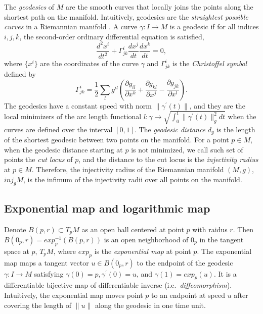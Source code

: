 \documentclass[11pt,a4paper,]{article}
\begin{document}
The \emph{geodesics} of \(M\) are the smooth curves that locally joins the points along the shortest path on the manifold. Intuitively, geodesics are the \emph{straightest possible curves} in a Riemannian manifold \autocite[Section 7.2.3 of][]{Nakahara2018-zs}.
A curve \(\gamma: I \rightarrow M\) is a geodesic if for all indices \(i,j,k\), the second-order ordinary differential equation is satisfied,
\[
\frac{d^2 x^i}{dt^2} + \Gamma^i_{jk} \frac{d x^j}{dt} \frac{dx^k}{dt} = 0,
\]
where \(\{x^i\}\) are the coordinates of the curve \(\gamma\) and \(\Gamma^i_{jk}\) is the \emph{Christoffel symbol} defined by
\[
\Gamma^i_{jk} = \frac{1}{2} \sum_l g^{il} (\frac{\partial g_{il}}{\partial x^k} 
+ \frac{\partial g_{kl}}{\partial x^j} - \frac{\partial g_{jk}}{\partial x^l}).
\]
The geodesics have a constant speed with norm \(\| \gamma^\prime(t) \|\), and they are the local minimizers of the arc
length functional \(l:\gamma \rightarrow \sqrt{\int_0^1 \| \gamma^\prime(t) \|_g^2 dt}\) when the curves are defined over the interval \([0,1]\).
The \emph{geodesic distance} \(d_g\) is the length of the shortest geodesic between two points on the manifold. For a point \(p \in M\), when the geodesic distance starting at \(p\) is not minimized, we call such set of points the \emph{cut locus} of \(p\), and the distance to the cut locus is the \emph{injectivity radius} at \(p \in M\). Therefore, the injectivity radius of the Riemannian manifold \((M,g)\), \(\textit{inj}_gM\), is the infimum of the injectivity radii over all points on the manifold.

\hypertarget{exponential-map-and-logarithmic-map}{%
\subsection{Exponential map and logarithmic map}\label{exponential-map-and-logarithmic-map}}

Denote \(B(p, r) \subset T_pM\) as an open ball centered at point \(p\) with raidus \(r\). Then \(B(0_p, r) = exp_p^{-1}(B(p,r))\) is an open neighborhood of \(0_p\) in the tangent space at \(p\), \(T_pM\), where \(exp_p\) is the \emph{exponential map} at point \(p\). The exponential map maps a tangent vector \(u \in B(0_p, r)\) to the endpoint of the geodesic \(\gamma: I \rightarrow M\) satisfying \(\gamma(0)=p, \gamma^{\prime}(0)=u\), and \(\gamma(1)=exp_p(u)\). It is a differentiable bijective map of differentiable inverse (i.e.~\emph{diffeomorphism}). Intuitively, the exponential map moves point \(p\) to an endpoint at speed \(u\) after covering the length of \(\|u\|\) along the geodesic in one time unit.
\end{document}
